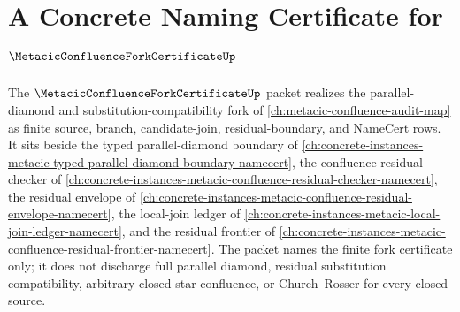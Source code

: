 \chapter{A Concrete Naming Certificate for $\MetacicConfluenceForkCertificateUp$}
\label{ch:concrete-instances-metacic-confluence-fork-certificate-namecert}

The $\MetacicConfluenceForkCertificateUp$ packet realizes the parallel-diamond and substitution-compatibility fork of \autoref{ch:metacic-confluence-audit-map} as finite source, branch, candidate-join, residual-boundary, and NameCert rows. It sits beside the typed parallel-diamond boundary of \autoref{ch:concrete-instances-metacic-typed-parallel-diamond-boundary-namecert}, the confluence residual checker of \autoref{ch:concrete-instances-metacic-confluence-residual-checker-namecert}, the residual envelope of \autoref{ch:concrete-instances-metacic-confluence-residual-envelope-namecert}, the local-join ledger of \autoref{ch:concrete-instances-metacic-local-join-ledger-namecert}, and the residual frontier of \autoref{ch:concrete-instances-metacic-confluence-residual-frontier-namecert}. The packet names the finite fork certificate only; it does not discharge full parallel diamond, residual substitution compatibility, arbitrary closed-star confluence, or Church--Rosser for every closed source.

